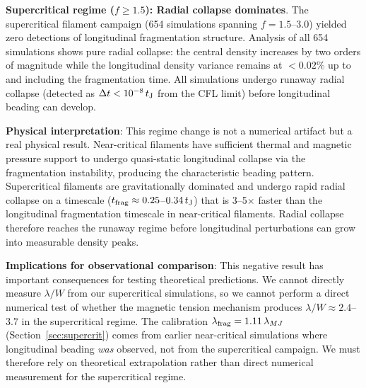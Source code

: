 \documentclass[twoside,twocolumn]{mnras}
\begin{document}
\textbf{Supercritical regime ($f \geq 1.5$): Radial collapse dominates}. The supercritical filament campaign (654 simulations spanning $f = 1.5$--$3.0$) yielded zero detections of longitudinal fragmentation structure. Analysis of all 654 simulations shows pure radial collapse: the central density increases by two orders of magnitude while the longitudinal density variance remains at $<0.02\%$ up to and including the fragmentation time. All simulations undergo runaway radial collapse (detected as $\Delta t < 10^{-8}\,t_{\rm J}$ from the CFL limit) before longitudinal beading can develop.

\textbf{Physical interpretation}: This regime change is not a numerical artifact but a real physical result. Near-critical filaments have sufficient thermal and magnetic pressure support to undergo quasi-static longitudinal collapse via the fragmentation instability, producing the characteristic beading pattern. Supercritical filaments are gravitationally dominated and undergo rapid radial collapse on a timescale ($t_{\rm frag} \approx 0.25$--$0.34\,t_{\rm J}$) that is 3--5$\times$ faster than the longitudinal fragmentation timescale in near-critical filaments. Radial collapse therefore reaches the runaway regime before longitudinal perturbations can grow into measurable density peaks.

\textbf{Implications for observational comparison}: This negative result has important consequences for testing theoretical predictions. We cannot directly measure $\lambda/W$ from our supercritical simulations, so we cannot perform a direct numerical test of whether the magnetic tension mechanism produces $\lambda/W \approx 2.4$--$3.7$ in the supercritical regime. The calibration $\lambda_{\rm frag} = 1.11\,\lambda_{MJ}$ (Section~\ref{sec:supercrit}) comes from earlier near-critical simulations where longitudinal beading \textit{was} observed, not from the supercritical campaign. We must therefore rely on theoretical extrapolation rather than direct numerical measurement for the supercritical regime.
\end{document}
